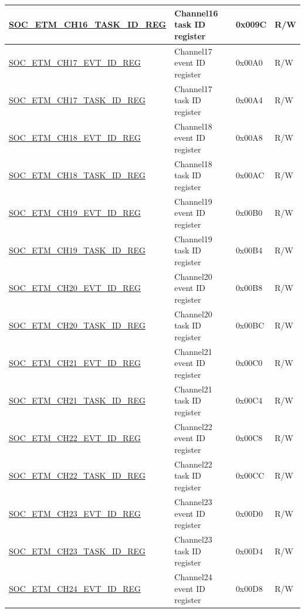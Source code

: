 \begin{longtable}{ | p{6cm} | p{6.2cm} | p{1.3cm} | p{2cm} | }
\hyperref[regdesc:SOCETMCHNTASKIDREG]{SOC\_ETM\_CH16\_TASK\_ID\_REG} & Channel16 task ID register & 0x009C & R/W \\ \hline
\hyperref[regdesc:SOCETMCHNEVTIDREG]{SOC\_ETM\_CH17\_EVT\_ID\_REG} & Channel17 event ID register & 0x00A0 & R/W \\ \hline
\hyperref[regdesc:SOCETMCHNTASKIDREG]{SOC\_ETM\_CH17\_TASK\_ID\_REG} & Channel17 task ID register & 0x00A4 & R/W \\ \hline
\hyperref[regdesc:SOCETMCHNEVTIDREG]{SOC\_ETM\_CH18\_EVT\_ID\_REG} & Channel18 event ID register & 0x00A8 & R/W \\ \hline
\hyperref[regdesc:SOCETMCHNTASKIDREG]{SOC\_ETM\_CH18\_TASK\_ID\_REG} & Channel18 task ID register & 0x00AC & R/W \\ \hline
\hyperref[regdesc:SOCETMCHNEVTIDREG]{SOC\_ETM\_CH19\_EVT\_ID\_REG} & Channel19 event ID register & 0x00B0 & R/W \\ \hline
\hyperref[regdesc:SOCETMCHNTASKIDREG]{SOC\_ETM\_CH19\_TASK\_ID\_REG} & Channel19 task ID register & 0x00B4 & R/W \\ \hline
\hyperref[regdesc:SOCETMCHNEVTIDREG]{SOC\_ETM\_CH20\_EVT\_ID\_REG} & Channel20 event ID register & 0x00B8 & R/W \\ \hline
\hyperref[regdesc:SOCETMCHNTASKIDREG]{SOC\_ETM\_CH20\_TASK\_ID\_REG} & Channel20 task ID register & 0x00BC & R/W \\ \hline
\hyperref[regdesc:SOCETMCHNEVTIDREG]{SOC\_ETM\_CH21\_EVT\_ID\_REG} & Channel21 event ID register & 0x00C0 & R/W \\ \hline
\hyperref[regdesc:SOCETMCHNTASKIDREG]{SOC\_ETM\_CH21\_TASK\_ID\_REG} & Channel21 task ID register & 0x00C4 & R/W \\ \hline
\hyperref[regdesc:SOCETMCHNEVTIDREG]{SOC\_ETM\_CH22\_EVT\_ID\_REG} & Channel22 event ID register & 0x00C8 & R/W \\ \hline
\hyperref[regdesc:SOCETMCHNTASKIDREG]{SOC\_ETM\_CH22\_TASK\_ID\_REG} & Channel22 task ID register & 0x00CC & R/W \\ \hline
\hyperref[regdesc:SOCETMCHNEVTIDREG]{SOC\_ETM\_CH23\_EVT\_ID\_REG} & Channel23 event ID register & 0x00D0 & R/W \\ \hline
\hyperref[regdesc:SOCETMCHNTASKIDREG]{SOC\_ETM\_CH23\_TASK\_ID\_REG} & Channel23 task ID register & 0x00D4 & R/W \\ \hline
\hyperref[regdesc:SOCETMCHNEVTIDREG]{SOC\_ETM\_CH24\_EVT\_ID\_REG} & Channel24 event ID register & 0x00D8 & R/W \\ \hline

\end{longtable}
